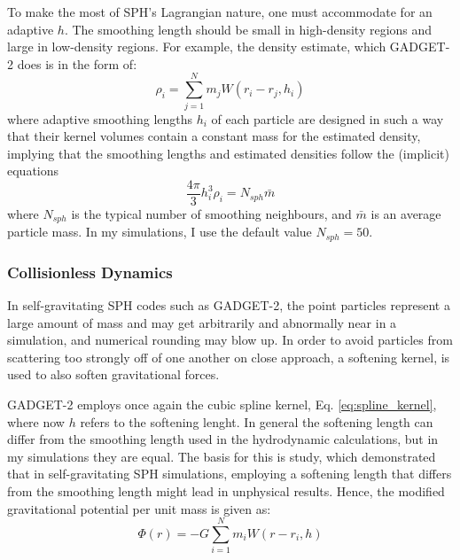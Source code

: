 To make the most of SPH's Lagrangian nature, one must accommodate for an adaptive $h$. The smoothing length should be small in high-density regions and large in low-density regions. For example, the density estimate,  which GADGET-2 does is in the form of:
\begin{equation}
    \rho_i = \sum_{j=1}^{N} m_j W(r_i -r_j,h_i)
\end{equation}
where adaptive smoothing lengths $h_i$ of each particle are designed in such a way that their kernel volumes contain a constant mass for the estimated density, implying that the smoothing lengths and estimated densities follow the (implicit) equations
\begin{equation}
    \frac{4\pi}{3} h_{i}^3 \rho_i = N_{sph} \bar{m}
\end{equation}
where $N_{sph}$ is the typical number of smoothing neighbours, and $\bar{m}$ is an average particle mass. In my simulations, I use the default value $N_{sph}=50$. 

\subsubsection{Collisionless Dynamics}

In self-gravitating SPH codes such as GADGET-2, the point particles represent a large amount of mass and may get arbitrarily and abnormally near in a simulation, and numerical rounding may blow up. In order to avoid particles from scattering too strongly off of one another on close approach, a softening kernel, is used to also soften gravitational forces. 

GADGET-2 employs once again the cubic spline kernel, Eq. \eqref{eq:spline_kernel}, where now $h$ refers to the softening lenght. In general the softening length can differ from the smoothing length used in the hydrodynamic calculations, but in my simulations they are equal. The basis for this is \cite{bate1997resolution} study, which demonstrated that in self-gravitating SPH simulations, employing a softening length that differs from the smoothing length might lead in unphysical results. Hence, the modified gravitational potential per unit mass is given as:
\begin{equation}\label{eq:softened_gravity}
   \Phi(r) = -G\sum_{i=1}^{N} m_i W(r-r_i,h)
\end{equation}



